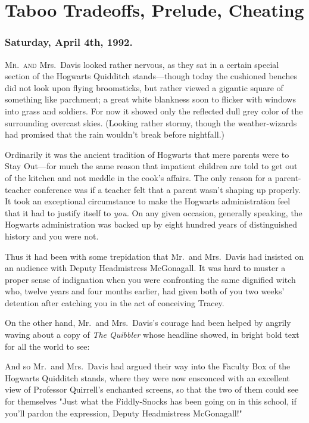 \chapter{Taboo Tradeoffs, Prelude, Cheating}

\subsection{Saturday, April 4th, 1992.}

\lettrine{M}{r.~and} Mrs.~Davis looked rather nervous, as they sat in a certain special
section of the Hogwarts Quidditch stands—though today the cushioned benches
did not look upon flying broomsticks, but rather viewed a gigantic square of
something like parchment; a great white blankness soon to flicker with windows
into grass and soldiers. For now it showed only the reflected dull grey color
of the surrounding overcast skies. (Looking rather stormy, though the
weather-wizards had promised that the rain wouldn't break before nightfall.)

Ordinarily it was the ancient tradition of Hogwarts that mere parents were to
Stay Out—for much the same reason that impatient children are told to get out
of the kitchen and not meddle in the cook's affairs. The only reason for a
parent-teacher conference was if a teacher felt that a parent wasn't shaping up
properly. It took an exceptional circumstance to make the Hogwarts
administration feel that it had to justify itself to \emph{you.} On any given
occasion, generally speaking, the Hogwarts administration was backed up by
eight hundred years of distinguished history and you were not.

Thus it had been with some trepidation that Mr.~and Mrs.~Davis had insisted on
an audience with Deputy Headmistress McGonagall. It was hard to muster a proper
sense of indignation when you were confronting the same dignified witch who,
twelve years and four months earlier, had given both of you two weeks'
detention after catching you in the act of conceiving Tracey.

On the other hand, Mr.~and Mrs.~Davis's courage had been helped by angrily
waving about a copy of \emph{The Quibbler} whose headline showed, in bright
bold text for all the world to see:


And so Mr.~and Mrs.~Davis had argued their way into the Faculty Box of the
Hogwarts Quidditch stands, where they were now ensconced with an excellent view
of Professor Quirrell's enchanted screens, so that the two of them could see
for themselves "Just what the Fiddly-Snocks has been going on in this school,
if you'll pardon the expression, Deputy Headmistress McGonagall!"

